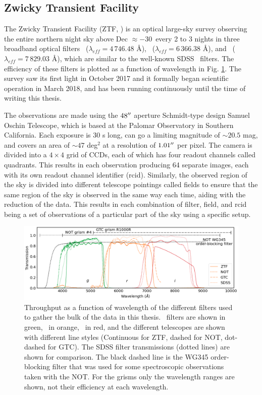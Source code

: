 \documentclass[a4paper,oneside,12pt, class=Latex/Classes/PhDthesisPSnPDF, crop=false]{standalone}
\begin{document}
\subsection{Zwicky Transient Facility}
\label{ZTF}
The Zwicky Transient Facility (ZTF, \citealt{ZTF_Surveys_Scheduler, ZTF_overview_and_1st_results, ZTF_Science_Objectives, ZTF_Instrumentation, ZTF_Observing_System}) is an optical large-sky survey observing the entire northern night sky above Dec $\approx -30$\degree\ every 2 to 3 nights in three broadband optical filters \ztfg~($\lambda_{eff} = 4\,746.48$ \AA), \ztfr~($\lambda_{eff} = 6\,366.38$ \AA), and \ztfi~($\lambda_{eff} = 7\,829.03$ \AA), which are similar to the well-known SDSS \ztfg\ztfr\ztfi\ filters. The efficiency of these filters is plotted as a function of wavelength in Fig. \ref{Optical_elements_plot}. The survey saw its first light in October 2017 and it formally began scientific operation in March 2018, and has been running continuously until the time of writing this thesis.

The observations are made using the $48^{\prime\prime}$ aperture Schmidt-type design Samuel Oschin Telescope, which is based at the Palomar Observatory in Southern California. Each exposure is 30 s long, can go a limiting magnitude of $\sim20.5$ mag, and covers an area of $\sim47$ deg$^2$ at a resolution of $1.01^{\prime\prime}$ per pixel. The camera is divided into a $4\times4$ grid of CCDs, each of which has four readout channels called quadrants. This results in each observation producing 64 separate images, each with its own readout channel identifier (rcid). Similarly, the observed region of the sky is divided into different telescope pointings called fields to ensure that the same region of the sky is observed in the same way each time, aiding with the reduction of the data. This results in each combination of filter, field, and rcid being a set of observations of a particular part of the sky using a specific setup.

\begin{figure}
    \centering
    \includegraphics[width=\textwidth]{../Images/chapter_2/transmissions.png}
    \caption{Throughput as a function of wavelength of the different filters used to gather the bulk of the data in this thesis. \ztfg\ filters are shown in green, \ztfr\ in orange, \ztfi\ in red, and the different telescopes are shown with different line styles (Continuous for ZTF, dashed for NOT, dot-dashed for GTC). The SDSS filter transmissions (dotted lines) are shown for comparison. The black dashed line is the WG345 order-blocking filter that was used for some spectroscopic observations taken with the NOT. For the grisms only the wavelength ranges are shown, not their efficiency at each wavelength.}
    \label{Optical_elements_plot}
\end{figure}
\end{document}
